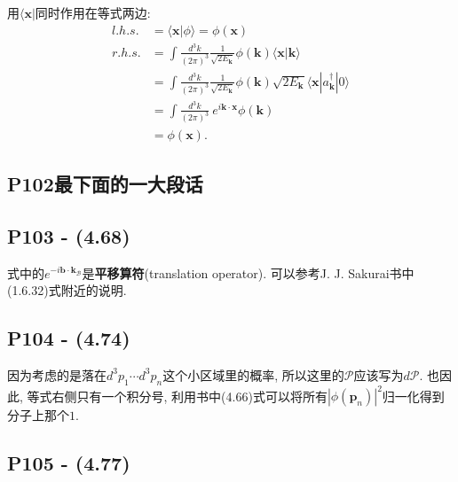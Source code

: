\documentclass[10pt,b5paper,openany]{book}
\begin{document}
用$\langle \mathbf{x}|$同时作用在等式两边: 
\begin{equation}
  \begin{aligned}
    l.h.s. &= \langle \mathbf{x}|\phi \rangle = \phi(\mathbf{x}) \\ 
    r.h.s. &= \int\frac{d^3 k}{(2\pi)^3}\frac{1}{\sqrt{2E_{\mathbf{k}}}}\phi(\mathbf{k})\langle \mathbf{x}|\mathbf{k} \rangle \\
    &= \int\frac{d^3 k}{(2\pi)^3}\frac{1}{\sqrt{2E_{\mathbf{k}}}}\phi(\mathbf{k})\sqrt{2E_{\mathbf{k}}}\langle \mathbf{x}|a^{\dagger}_{\mathbf{k}}|0 \rangle \\
    &= \int\frac{d^3 k}{(2\pi)^3}\ e^{i\mathbf{k}\cdot\mathbf{x}}\phi(\mathbf{k}) \\
    &= \phi(\mathbf{x}).
  \end{aligned}
\end{equation}

\subsection{P102最下面的一大段话}

\begin{center}
\end{center}

\subsection{P103 - (4.68)}

式中的$e^{-i\mathbf{b}\cdot\mathbf{k_{\mathcal{B}}}}$是\textbf{平移算符}(translation operator). 可以参考J. J. Sakurai书中(1.6.32)式附近的说明. 

\subsection{P104 - (4.74)}

因为考虑的是落在$d^3p_1\cdots d^3p_n$这个小区域里的概率, 所以这里的$\mathcal{P}$应该写为$d\mathcal{P}$. 也因此, 等式右侧只有一个积分号, 利用书中(4.66)式可以将所有$|\phi(\mathbf{p}_n)|^2$归一化得到分子上那个$1$. 

\subsection{P105 - (4.77)}
\end{document}
